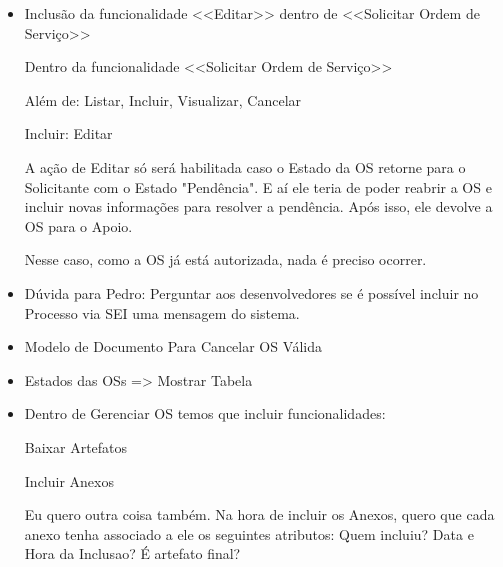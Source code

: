 \begin{itemize}
	
	
	
	\item \mschecksim Inclusão da funcionalidade <<Editar>> dentro de <<Solicitar Ordem de Serviço>> 


Dentro da funcionalidade <<Solicitar Ordem de Serviço>>

Além de:
Listar, Incluir, Visualizar, Cancelar

Incluir:
Editar

A ação de Editar só será habilitada caso o Estado da OS retorne para o Solicitante com o Estado "Pendência". E aí ele teria de poder reabrir a OS e incluir novas informações para resolver a pendência. Após isso, ele devolve a OS para o Apoio.

Nesse caso, como a OS já está autorizada, nada é preciso ocorrer. 


	\item \mschecksim Dúvida para Pedro: Perguntar aos desenvolvedores se é possível incluir no Processo via SEI uma mensagem do sistema.
	
	\item \mschecksim Modelo de Documento Para Cancelar OS Válida
	
	\item \mschecksim Estados das OSs => Mostrar Tabela
	
	\item \mschecksim Dentro de Gerenciar OS temos que incluir funcionalidades:
	
	Baixar Artefatos
	
	Incluir Anexos
	
	Eu quero outra coisa também. Na hora de incluir os Anexos, quero que cada anexo tenha associado a ele os seguintes atributos: Quem incluiu? Data e Hora da Inclusao? É artefato final?
\end{itemize}
